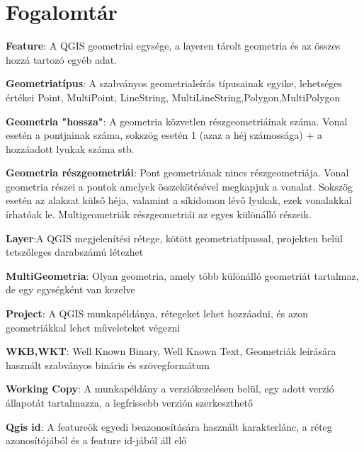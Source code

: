 \section{Fogalomtár}
\begin{definition}
	\label{def:1}
	\textbf{Feature}: A QGIS geometriai egysége, a layeren tárolt geometria és az összes hozzá tartozó egyéb adat.
\end{definition}
\begin{definition}
	\label{def:2}
	\textbf{Geometriatípus}: A szabványos geometrialeírás típusainak egyike, lehetséges értékei Point, MultiPoint, LineString, MultiLineString,Polygon,MultiPolygon
\end{definition}
\begin{definition}
	\label{def:3}
	\textbf{Geometria "hossza"}: A geometria közvetlen részgeometriáinak száma. Vonal esetén a pontjainak száma, sokszög esetén 1 (azaz a héj számossága) + a hozzáadott lyukak száma stb.
\end{definition}
\begin{definition}
	\label{def:4}
	\textbf{Geometria részgeometriái}: Pont geometriának nincs részgeometriája. Vonal geometria részei a pontok amelyek összekötésével megkapjuk a vonalat. Sokszög esetén az alakzat külső héja, valamint a síkidomon lévő lyukak, ezek vonalakkal írhatóak le. Multigeometriák részgeometriái az egyes különálló részeik.
\end{definition}
\begin{definition}
	\label{def:5}
	\textbf{Layer}:A QGIS megjelenítési rétege, kötött geometriatípussal, projekten belül tetszőleges darabszámú létezhet
\end{definition}
\begin{definition}
	\label{def:6}
	\textbf{MultiGeometria}: Olyan geometria, amely több különálló geometriát tartalmaz, de egy egységként van kezelve
\end{definition}
\begin{definition}
	\label{def:7}
	\textbf{Project}: A QGIS munkapéldánya, rétegeket lehet hozzáadni, és azon geometriákkal lehet műveleteket végezni
\end{definition}
\begin{definition}
	\label{def:8}
	\textbf{WKB,WKT}: Well Known Binary, Well Known Text, Geometriák leírására használt szabványos bináris és szövegformátum
\end{definition}
\begin{definition}
	\label{def:9}
	\textbf{Working Copy}: A munkapéldány a verziókezelésen belül, egy adott verzió állapotát tartalmazza, a legfrissebb verzión szerkeszthető
\end{definition}
\begin{definition}
	\label{def:10}
	\textbf{Qgis id}: A featureök egyedi beazonosítására használt karakterlánc, a réteg azonosítójából és a feature id-jából áll elő
\end{definition}
